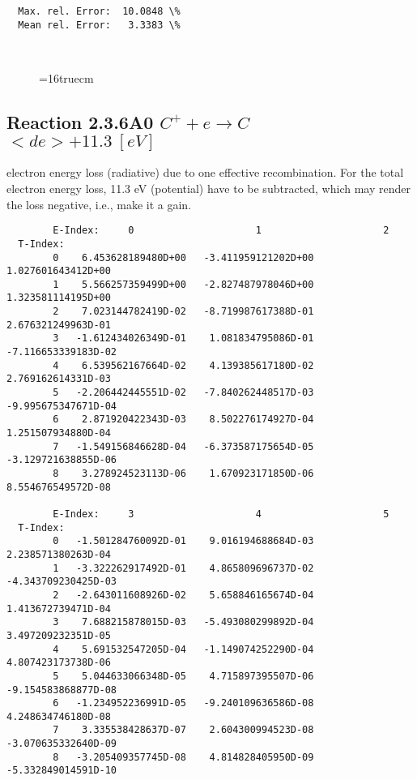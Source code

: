 \documentclass[12pt,dvipdfmx]{article}
\begin{document}
{\begin{small}
\begin{verbatim}
  Max. rel. Error:  10.0848 \%
  Mean rel. Error:   3.3383 \%



\end{verbatim}\end{small}
\begin{figure} \label{2.3.6il1}
\epsfxsize=16truecm
\end{figure}
\newpage

\subsection{
  Reaction 2.3.6A0 $C^+ + e \rightarrow C   $  \ $ <de>+11.3 \ [eV] $
}

  electron energy loss (radiative) due to one effective recombination.
  For the total electron energy loss, 11.3 eV (potential) have to be
  subtracted, which may render the loss negative, i.e., make it a gain.

\begin{small}\begin{verbatim}
        E-Index:     0                     1                     2
  T-Index:
        0    6.453628189480D+00   -3.411959121202D+00    1.027601643412D+00
        1    5.566257359499D+00   -2.827487978046D+00    1.323581114195D+00
        2    7.023144782419D-02   -8.719987617388D-01    2.676321249963D-01
        3   -1.612434026349D-01    1.081834795086D-01   -7.116653339183D-02
        4    6.539562167664D-02    4.139385617180D-02    2.769162614331D-03
        5   -2.206442445551D-02   -7.840262448517D-03   -9.995675347671D-04
        6    2.871920422343D-03    8.502276174927D-04    1.251507934880D-04
        7   -1.549156846628D-04   -6.373587175654D-05   -3.129721638855D-06
        8    3.278924523113D-06    1.670923171850D-06    8.554676549572D-08

        E-Index:     3                     4                     5
  T-Index:
        0   -1.501284760092D-01    9.016194688684D-03    2.238571380263D-04
        1   -3.322262917492D-01    4.865809696737D-02   -4.343709230425D-03
        2   -2.643011608926D-02    5.658846165674D-04    1.413672739471D-04
        3    7.688215878015D-03   -5.493080299892D-04    3.497209232351D-05
        4    5.691532547205D-04   -1.149074252290D-04    4.807423173738D-06
        5    5.044633066348D-05    4.715897395507D-06   -9.154583868877D-08
        6   -1.234952236991D-05   -9.240109636586D-08    4.248634746180D-08
        7    3.335538428637D-07    2.604300994523D-08   -3.070635332640D-09
        8   -3.205409357745D-08    4.814828405950D-09   -5.332849014591D-10


\end{verbatim}
\end{small}}
\end{document}

